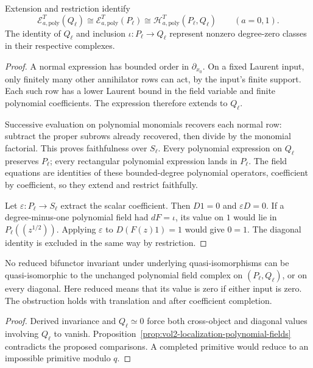 \begin{proposition}\label{prop:vol2-localization-polynomial-fields}
Extension and restriction identify
\[
 \mathcal E_{a,\mathrm{poly}}^T(Q_\ell)
 \cong\mathcal E_{a,\mathrm{poly}}^T(P_\ell)
 \cong\mathcal H_{a,\mathrm{poly}}^T(P_\ell,Q_\ell)
 \qquad(a=0,1).
\]
The identity of \(Q_\ell\) and inclusion
\(\iota:P_\ell\to Q_\ell\) represent nonzero degree-zero
classes in their respective complexes.
\end{proposition}
\begin{proof}
A normal expression has bounded order in
\(\partial_{x_0}\). On a fixed Laurent input, only finitely
many other annihilator rows can act, by the input's finite
support. Each such row has a lower Laurent bound in the field
variable and finite polynomial coefficients. The expression
therefore extends to \(Q_\ell\).

Successive evaluation on polynomial monomials recovers each
normal row: subtract the proper subrows already recovered,
then divide by the monomial factorial. This proves
faithfulness over \(S_\ell\). Every polynomial expression on
\(Q_\ell\) preserves \(P_\ell\); every rectangular polynomial
expression lands in \(P_\ell\). The field equations are
identities of these bounded-degree polynomial operators,
coefficient by coefficient, so they extend and restrict
faithfully.

Let \(\varepsilon:P_\ell\to S_\ell\) extract the scalar
coefficient. Then \(D1=0\) and \(\varepsilon D=0\).
If a degree-minus-one polynomial field had \(dF=\iota\),
its value on \(1\) would lie in \(P_\ell((z^{1/2}))\).
Applying \(\varepsilon\) to \(D(F(z)1)=1\) would give
\(0=1\). The diagonal identity is excluded in the same
way by restriction.
\end{proof}

\begin{theorem}\label{thm:vol2-polynomial-fields-not-derived}
No reduced bifunctor invariant under underlying
quasi-isomorphisms can be quasi-isomorphic to the unchanged
polynomial field complex on \((P_\ell,Q_\ell)\), or on
every diagonal.
Here reduced means that its value is zero if either input
is zero. The obstruction holds with translation and after
coefficient completion.
\end{theorem}
\begin{proof}
Derived invariance and \(Q_\ell\simeq0\) force both
cross-object and diagonal values involving \(Q_\ell\) to
vanish. Proposition~\ref{prop:vol2-localization-polynomial-fields}
contradicts the proposed comparisons. A completed primitive
would reduce to an impossible primitive modulo \(q\).
\end{proof}

